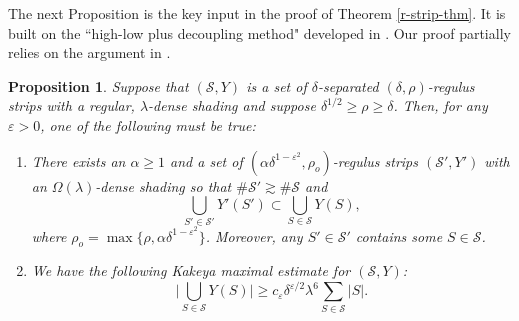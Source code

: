 \documentclass{amsart}%
\numberwithin{equation}{section}
\newtheorem{proposition}[theorem]{Proposition}
\newcommand{\al}{\alpha}
\newcommand{\de}{\delta}
\newcommand{\e}{\varepsilon}
\newcommand{\la}{\lambda}
\newcommand{\Om}{\Omega}
\newcommand{\cs}{\mathcal S}
\newcommand{\1}{\mathbbm{1}}
\begin{document}
The next Proposition is the key input in the proof of Theorem \ref{r-strip-thm}.
It is built on the ``high-low plus decoupling method" developed in \cite{GGGHMW}.
Our proof partially relies on the argument in \cite{GGGHMW}.



\begin{proposition}
\label{decoupling-prop}
Suppose that $(\cs, Y)$ is a set of $\de$-separated $(\de,\rho)$-regulus strips with a regular, $\la$-dense shading and suppose $\de^{1/2}\geq\rho\geq\de$. 
Then, for any $\e>0$, one of the following must be true:
\begin{enumerate}
    \item[(\bf A)] There exists an  $\al\geq1$ and a set of $(\al\de^{1-\e^2}, \rho_o)$-regulus strips $(\cs', Y')$ with an $\Om(\la)$-dense shading so that $\#\cs'\gtrsim \#\cs$ and 
    \begin{equation}
        \bigcup_{S'\in\cs'}Y'(S')\subset \bigcup_{S\in\cs}Y(S),
    \end{equation}
    where $\rho_o=\max\{\rho, \al\de^{1-\e^2}\}$.
    Moreover, any $S'\in\cs'$ contains some $S\in\cs$.
    \item[(\bf B)] We have the following Kakeya maximal estimate for $(\cs, Y)$:
    \begin{equation}
        \Big|\bigcup_{S\in\cs}Y(S)\Big|\geq c_\e\de^{\e/2}\la^{6}\sum_{S\in\cs}|S|.
    \end{equation}
\end{enumerate}

\end{proposition}
\end{document}
